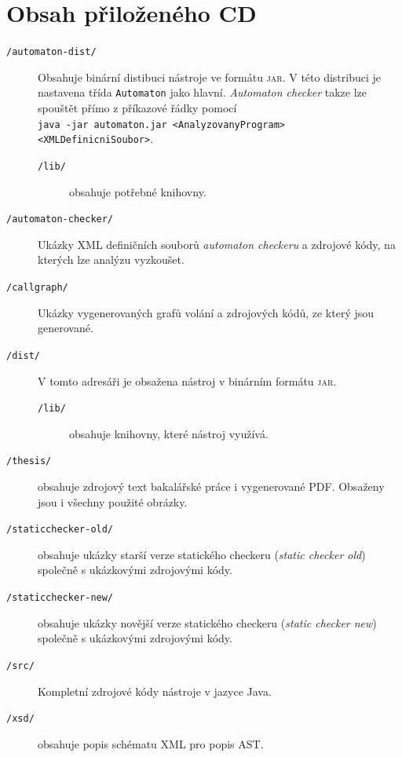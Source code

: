 \documentclass[11pt,final,oneside]{fithesis}
\begin{document}
\chapter{Obsah přiloženého CD}
\begin{description}
	\item[\texttt{/automaton-dist/}] Obsahuje binární distibuci nástroje ve formátu \textsc{jar}. V této distribuci je nastavena třída \texttt{Automaton} jako hlavní. \textit{Automaton checker} takze lze spouštět přímo z příkazové řádky pomocí\\ \texttt{java -jar automaton.jar <AnalyzovanyProgram>\\ <XMLDefinicniSoubor>}.
	\begin{description}
		\item[\texttt{/lib/}] obsahuje potřebné knihovny.
	\end{description}
	
	
	\item[\texttt{/automaton-checker/}] Ukázky XML definičních souborů \textit{automaton checkeru} a zdrojové kódy, na kterých lze analýzu vyzkoušet.
	
	\item[\texttt{/callgraph/}] Ukázky vygenerovaných grafů volání a zdrojových kódů, ze který jsou generované.
	
	\item[\texttt{/dist/}] V tomto adresáři je obsažena nástroj v binárním formátu \textsc{jar}.
	\begin{description}
		\item[\texttt{/lib/}] obsahuje knihovny, které nástroj využívá.
	\end{description}
	
	\item[\texttt{/thesis/}] obsahuje zdrojový text bakalářské práce i vygenerované \textsc{PDF}. Obsaženy jsou i všechny použité obrázky.
	
	\item[\texttt{/staticchecker-old/}] obsahuje ukázky starší verze statického checkeru (\textit{static checker old}) společně s ukázkovými zdrojovými kódy.
	
	\item[\texttt{/staticchecker-new/}] obsahuje ukázky novější verze statického checkeru (\textit{static checker new}) společně s ukázkovými zdrojovými kódy.
	
	\item[\texttt{/src/}] Kompletní zdrojové kódy nástroje v jazyce Java.
	
	\item[\texttt{/xsd/}] obsahuje popis schématu XML pro popis AST.	

\end{description}
\end{document}
